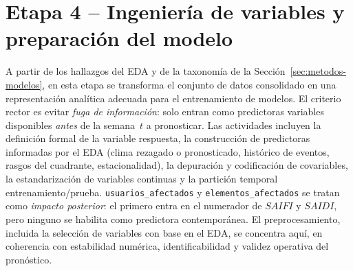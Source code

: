 \section{Etapa 4 – Ingeniería de variables y preparación del modelo}
\label{sec:metodología-etapa4}

A partir de los hallazgos del EDA y de la taxonomía de la Sección~\ref{sec:metodos-modelos}, en esta etapa se transforma el conjunto de datos consolidado en una representación analítica adecuada para el entrenamiento de modelos. El criterio rector es evitar \textit{fuga de información}: solo entran como predictoras variables disponibles \emph{antes} de la semana~$t$ a pronosticar. Las actividades incluyen la definición formal de la variable respuesta, la construcción de predictoras informadas por el EDA (clima rezagado o pronosticado, histórico de eventos, rasgos del cuadrante, estacionalidad), la depuración y codificación de covariables, la estandarización de variables continuas y la partición temporal entrenamiento/prueba. \texttt{usuarios\_afectados} y \texttt{elementos\_afectados} se tratan como \textit{impacto posterior}: el primero entra en el numerador de $SAIFI$ y $SAIDI$, pero ninguno se habilita como predictora contemporánea. El preprocesamiento, incluida la selección de variables con base en el EDA, se concentra aquí, en coherencia con estabilidad numérica, identificabilidad y validez operativa del pronóstico.

